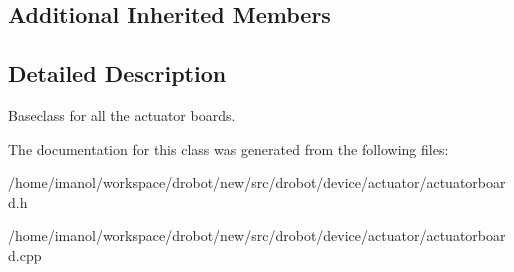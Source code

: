\subsection*{Additional Inherited Members}


\subsection{Detailed Description}
Baseclass for all the actuator boards. 

The documentation for this class was generated from the following files\-:\begin{DoxyCompactItemize}
\item 
/home/imanol/workspace/drobot/new/src/drobot/device/actuator/actuatorboard.\-h\item 
/home/imanol/workspace/drobot/new/src/drobot/device/actuator/actuatorboard.\-cpp\end{DoxyCompactItemize}
